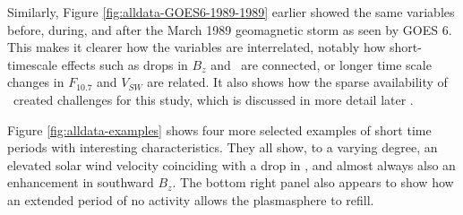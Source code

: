 Similarly, Figure \ref{fig:alldata-GOES6-1989-1989} earlier showed the same variables before, during, and after the March 1989 geomagnetic storm as seen by GOES 6. This makes it clearer how the variables are interrelated, notably how short-timescale effects such as drops in $B_z$ and \dst\ are connected, or longer time scale changes in $F_{10.7}$ and $V_{SW}$ are related. It also shows how the sparse availability of \req\ created challenges for this study, which is discussed in more detail later . 

Figure \ref{fig:alldata-examples} shows four more selected examples of short time periods with interesting characteristics. They all show, to a varying degree, an elevated solar wind velocity coinciding with a drop in \dst, and almost always also an enhancement in southward $B_z$. The bottom right panel also appears to show how an extended period of no activity allows the plasmasphere to refill.



